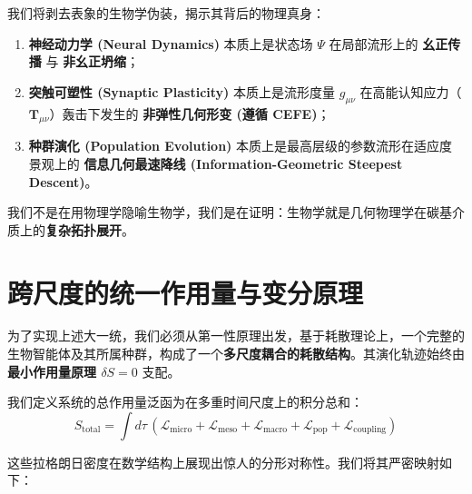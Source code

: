 我们将剥去表象的生物学伪装，揭示其背后的物理真身：
\begin{enumerate}
    \item \textbf{神经动力学 (Neural Dynamics)} 本质上是状态场 $\Psi$ 在局部流形上的 \textbf{幺正传播} 与 \textbf{非幺正坍缩}；
    \item \textbf{突触可塑性 (Synaptic Plasticity)} 本质上是流形度量 $g_{\mu\nu}$ 在高能认知应力（$\mathbf{T}_{\mu\nu}$）轰击下发生的 \textbf{非弹性几何形变 (遵循 CEFE)}；
    \item \textbf{种群演化 (Population Evolution)} 本质上是最高层级的参数流形在适应度景观上的 \textbf{信息几何最速降线 (Information-Geometric Steepest Descent)}。
\end{enumerate}

我们不是在用物理学隐喻生物学，我们是在证明：生物学就是几何物理学在碳基介质上的\textbf{复杂拓扑展开}。

\section{跨尺度的统一作用量与变分原理}
\label{sec:unified_action_across_scales}

为了实现上述大一统，我们必须从第一性原理出发，基于耗散理论上，一个完整的生物智能体及其所属种群，构成了一个\textbf{多尺度耦合的耗散结构}。其演化轨迹始终由\textbf{最小作用量原理 $\delta S = 0$} 支配。


我们定义系统的总作用量泛函为在多重时间尺度上的积分总和：
\begin{equation}
    S_{\text{total}} = \int d\tau \, \left( \mathcal{L}_{\text{micro}} + \mathcal{L}_{\text{meso}} + \mathcal{L}_{\text{macro}} + \mathcal{L}_{\text{pop}} + \mathcal{L}_{\text{coupling}} \right)
\end{equation}

这些拉格朗日密度在数学结构上展现出惊人的分形对称性。我们将其严密映射如下：

